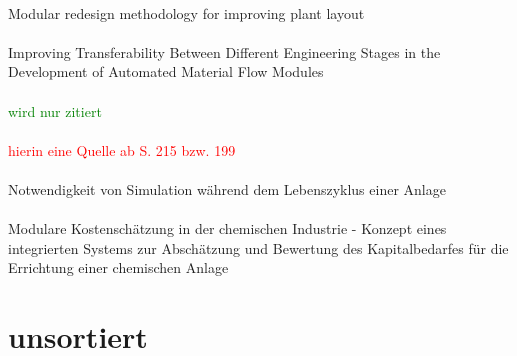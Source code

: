 \paragraph*{\cite{Lugo_2015}} Modular redesign methodology for improving plant layout

\paragraph*{\cite{Regulin_2016}} Improving Transferability Between Different Engineering Stages in the Development of Automated Material Flow Modules

\paragraph*{\cite{Krekel_1985}} \textcolor{green}{wird nur zitiert}

\paragraph*{\cite{Perkins_1992}} \textcolor{red}{hierin eine Quelle ab S. 215 bzw. 199}

\paragraph*{\cite{Oppelt_2015}}
Notwendigkeit von Simulation w\"ahrend dem Lebenszyklus einer Anlage

\paragraph*{\cite{Strauch_2008}} Modulare Kostensch{\"a}tzung in der chemischen Industrie - Konzept eines integrierten Systems zur Absch{\"a}tzung und Bewertung des Kapitalbedarfes f{\"u}r die Errichtung einer chemischen Anlage

\section{unsortiert}